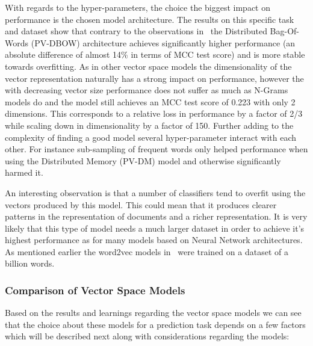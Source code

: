 With regards to the hyper-parameters, the choice the biggest impact on performance is the chosen model architecture. The results on this specific task and dataset show that contrary to the observations in~\cite{Le:2014aa} the Distributed Bag-Of-Words (PV-DBOW) architecture achieves significantly higher performance (an absolute difference of almost 14\% in terms of \gls{MCC} test score) and is more stable towards overfitting.
As in other vector space models the dimensionality of the vector representation naturally has a strong impact on performance, however the with decreasing vector size performance does not suffer as much as N-Grams models do and the model still achieves an \gls{MCC} test score of 0.223 with only 2 dimensions. This corresponds to a relative loss in performance by a factor of 2/3 while scaling down in dimensionality by a factor of 150. Further adding to the complexity of finding a good model several hyper-parameter interact with each other. For instance sub-sampling of frequent words only helped performance when using the Distributed Memory (PV-DM) model and otherwise significantly harmed it.

An interesting observation is that a number of classifiers tend to overfit using the vectors produced by this model. This could mean that it produces clearer patterns in the representation of documents and a richer representation. It is very likely that this type of model needs a much larger dataset in order to achieve it's highest performance as for many models based on Neural Network architectures. As mentioned earlier the word2vec models in~\cite{Mikolov:2013ad} were trained on a dataset of a billion words.



\subsubsection{Comparison of Vector Space Models}
\label{subs:Comparison of Vector Space Models}

Based on the results and learnings regarding the vector space models we can see that the choice about these models for a prediction task depends on a few factors which will be described next along with considerations regarding the models:

